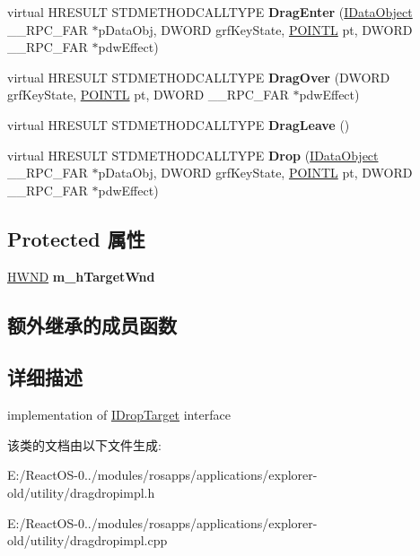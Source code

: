 \begin{DoxyCompactItemize}
virtual H\+R\+E\+S\+U\+LT S\+T\+D\+M\+E\+T\+H\+O\+D\+C\+A\+L\+L\+T\+Y\+PE {\bfseries Drag\+Enter} (\hyperlink{interface_i_data_object}{I\+Data\+Object} \+\_\+\+\_\+\+R\+P\+C\+\_\+\+F\+AR $\ast$p\+Data\+Obj, D\+W\+O\+RD grf\+Key\+State, \hyperlink{struct___p_o_i_n_t_l}{P\+O\+I\+N\+TL} pt, D\+W\+O\+RD \+\_\+\+\_\+\+R\+P\+C\+\_\+\+F\+AR $\ast$pdw\+Effect)
\item 
\mbox{\label{class_i_drop_target_impl_af97e527eaf709828da89bf952406dbb1}} 
virtual H\+R\+E\+S\+U\+LT S\+T\+D\+M\+E\+T\+H\+O\+D\+C\+A\+L\+L\+T\+Y\+PE {\bfseries Drag\+Over} (D\+W\+O\+RD grf\+Key\+State, \hyperlink{struct___p_o_i_n_t_l}{P\+O\+I\+N\+TL} pt, D\+W\+O\+RD \+\_\+\+\_\+\+R\+P\+C\+\_\+\+F\+AR $\ast$pdw\+Effect)
\item 
\mbox{\label{class_i_drop_target_impl_a6b1381b5f2febb31fc984cd9b31513bd}} 
virtual H\+R\+E\+S\+U\+LT S\+T\+D\+M\+E\+T\+H\+O\+D\+C\+A\+L\+L\+T\+Y\+PE {\bfseries Drag\+Leave} ()
\item 
\mbox{\label{class_i_drop_target_impl_a3e3a08121bcdb7bdd7395a5d876cfef4}} 
virtual H\+R\+E\+S\+U\+LT S\+T\+D\+M\+E\+T\+H\+O\+D\+C\+A\+L\+L\+T\+Y\+PE {\bfseries Drop} (\hyperlink{interface_i_data_object}{I\+Data\+Object} \+\_\+\+\_\+\+R\+P\+C\+\_\+\+F\+AR $\ast$p\+Data\+Obj, D\+W\+O\+RD grf\+Key\+State, \hyperlink{struct___p_o_i_n_t_l}{P\+O\+I\+N\+TL} pt, D\+W\+O\+RD \+\_\+\+\_\+\+R\+P\+C\+\_\+\+F\+AR $\ast$pdw\+Effect)
\end{DoxyCompactItemize}
\subsection*{Protected 属性}
\begin{DoxyCompactItemize}
\item 
\mbox{\label{class_i_drop_target_impl_ae2214df5492c7bd8780e44b10cc219a4}} 
\hyperlink{interfacevoid}{H\+W\+ND} {\bfseries m\+\_\+h\+Target\+Wnd}
\end{DoxyCompactItemize}
\subsection*{额外继承的成员函数}


\subsection{详细描述}
implementation of \hyperlink{interface_i_drop_target}{I\+Drop\+Target} interface 

该类的文档由以下文件生成\+:\begin{DoxyCompactItemize}
\item 
E\+:/\+React\+O\+S-\/0../modules/rosapps/applications/explorer-\/old/utility/dragdropimpl.\+h\item 
E\+:/\+React\+O\+S-\/0../modules/rosapps/applications/explorer-\/old/utility/dragdropimpl.\+cpp\end{DoxyCompactItemize}
